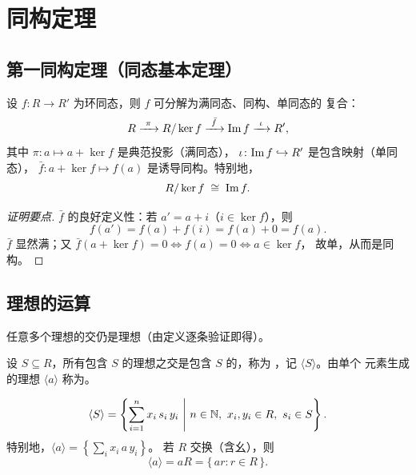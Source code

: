 \section{同构定理}\label{sec:iso-theorems}

\subsection{第一同构定理（同态基本定理）}

\begin{theorem}[环的第一同构定理]
设 $f\colon R\to R'$ 为环同态，则 $f$ 可分解为满同态、同构、单同态的
复合：
\[
  R \xrightarrow{\ \pi\ } R/\ker f \xrightarrow{\ \bar f\ }
  \mathrm{Im}\, f \xrightarrow{\ \iota\ } R',
\]
其中 $\pi\colon a\mapsto a+\ker f$ 是典范投影（满同态），
$\iota\colon\mathrm{Im}\, f\hookrightarrow R'$ 是包含映射（单同态），
$\bar f\colon a+\ker f\mapsto f(a)$ 是诱导同构。特别地，
\[
  R/\ker f \;\cong\; \mathrm{Im}\, f.
\]
\end{theorem}

\begin{proof}[证明要点]
$\bar f$ 的良好定义性：若 $a' = a + i$（$i\in\ker f$），则
\[
  f(a') = f(a) + f(i) = f(a) + 0 = f(a).
\]
$\bar f$ 显然满；又 $\bar f(a+\ker f) = 0 \iff f(a) = 0 \iff a\in\ker f$，
故单，从而是同构。
\end{proof}

\subsection{理想的运算}

\begin{proposition}[理想之交仍为理想]
任意多个理想的交仍是理想（由定义逐条验证即得）。
\end{proposition}

\begin{definition}
设 $S\subseteq R$，所有包含 $S$ 的理想之交是包含 $S$ 的，称为 ，记 $\langle S\rangle$。由单个
元素生成的理想 $\langle a\rangle$ 称为。
\end{definition}

\begin{proposition}[生成理想的显式刻画]
\[
  \langle S\rangle = \left\{ \sum_{i=1}^{n} x_i\, s_i\, y_i
    \ \middle|\ n\in\mathbb{N},\ x_i, y_i\in R,\ s_i\in S \right\}.
\]
特别地，$\langle a\rangle = \left\{\sum_i x_i\, a\, y_i\right\}$。
若 $R$ 交换（含幺），则
\[
  \langle a\rangle = aR = \{\,ar : r\in R\,\}.
\]
\end{proposition}

